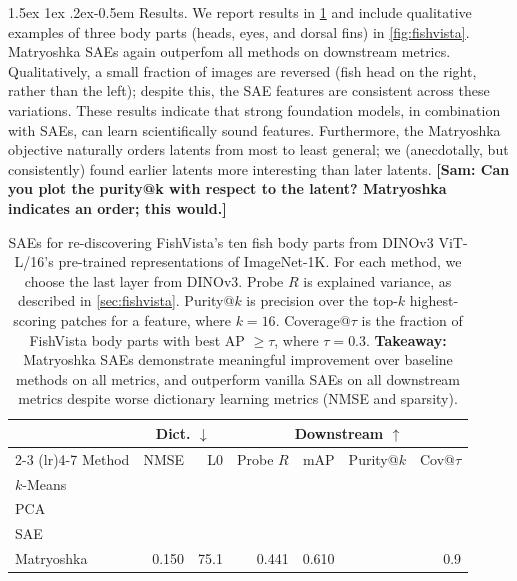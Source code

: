 \documentclass[10pt,twocolumn,letterpaper]{article}
\makeatletter
\newcommand{\sam}[1]{\textbf{\color{blue}[Sam: #1]}}
\renewcommand{\paragraph}{%
  \@startsection{paragraph}{4}%
  {\z@}{1.5ex \@plus 1ex \@minus .2ex}{-0.5em}%
  {\normalfont\normalsize\bfseries}%
}
\makeatother
\begin{document}
\paragraph{Results.}
We report results in \cref{tab:fishvista} and include qualitative examples of three body parts (heads, eyes, and dorsal fins) in \cref{fig:fishvista}.
Matryoshka SAEs again outperfom all methods on downstream metrics.
Qualitatively, a small fraction of images are reversed (fish head on the right, rather than the left); despite this, the SAE features are consistent across these variations.
These results indicate that strong foundation models, in combination with SAEs, can learn scientifically sound features.
Furthermore, the Matryoshka objective naturally orders latents from most to least general; we (anecdotally, but consistently) found earlier latents more interesting than later latents.
\sam{Can you plot the purity@k with respect to the latent? Matryoshka indicates an order; this would.}

\begin{table}[t]
    \centering
    \small
    \setlength{\tabcolsep}{3pt}
    \caption{SAEs for re-discovering FishVista's ten fish body parts from DINOv3 ViT-L/16's pre-trained representations of ImageNet-1K.
    For each method, we choose the last layer from DINOv3.
    Probe $R$ is explained variance, as described in \cref{sec:fishvista}.
    Purity@$k$ is precision over the top-$k$ highest-scoring patches for a feature, where $k=16$.
    Coverage@$\tau$ is the fraction of FishVista body parts with best AP $\geq\tau$, where $\tau= 0.3$.
    \textbf{Takeaway:} Matryoshka SAEs demonstrate meaningful improvement over baseline methods on all metrics, and outperform vanilla SAEs on all downstream metrics despite worse dictionary learning metrics (NMSE and sparsity).}
    \label{tab:fishvista}
    \begin{tabular}{lrrrrrr}
    \toprule
    & \multicolumn{2}{c}{Dict. $\downarrow$} & \multicolumn{4}{c}{Downstream $\uparrow$} \\
    \cmidrule(lr){2-3} \cmidrule(lr){4-7}
    Method & NMSE & L0 & Probe $R$ & mAP & Purity@$k$ & Cov@$\tau$ \\
    \midrule
    $k$-Means & \\
    PCA \\
    SAE        & & & & & & \\
    Matryoshka & 0.150 & 75.1 & 0.441 & 0.610 & & 0.9 \\
    \bottomrule
    \end{tabular}
\end{table}
\end{document}
